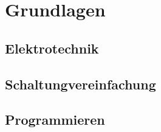 \section{Grundlagen} \label{sec:grundlagen}

\subsection{Elektrotechnik} \label{subsec:elektrotechnik}






\subsection{Schaltungvereinfachung} \label{subsec:elektrotechnik}




\subsection{Programmieren} \label{subsec:softech}



